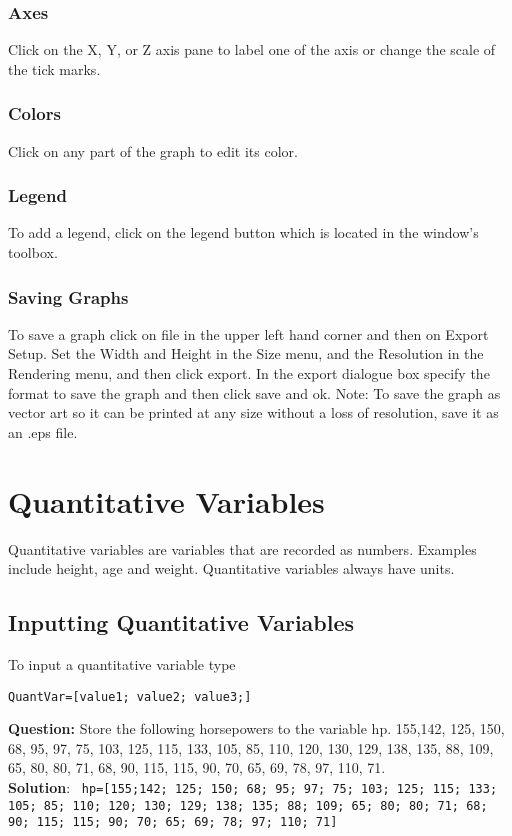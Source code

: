 \documentclass[10pt]{article}
\begin{document}
\subsubsection{Axes}
Click on the X, Y, or Z axis pane to label one of the axis or change the scale of the tick marks.
\subsubsection{Colors}
Click on any part of the graph to edit its color.
\subsubsection{Legend}
To add a legend, click on the legend button which is located in the window's toolbox.
\subsubsection{Saving Graphs}
To save a graph click on file in the upper left hand corner and then on Export Setup. Set the Width and Height in the Size menu, and the Resolution in the Rendering menu, and then click export. In the export dialogue box specify the format to save the graph and then click save and ok. Note: To save the graph as vector art so it can be printed at any size without a loss of resolution, save it as an .eps file. 
\section{Quantitative Variables}
Quantitative variables are variables that are recorded as numbers. Examples include height, age and weight. Quantitative variables always have units.
\subsection{Inputting Quantitative Variables}
To input a quantitative variable type \begin{verbatim}QuantVar=[value1; value2; value3;] \end{verbatim}
\textbf{Question:}
Store the following horsepowers to the variable hp. 155,142, 125, 150, 68, 95, 97, 75, 103, 125, 115, 133, 105, 85, 110, 120, 130, 129, 138, 135, 88, 109, 65, 80, 80, 71, 68, 90, 115, 115, 90, 70, 65, 69, 78, 97, 110, 71.
 \\\textbf{Solution}: 
\texttt{ hp=[155;142; 125; 150; 68; 95; 97; 75; 103; 125; 115; 133; 105; 85; 110; 120; 130; 129; 138; 135; 88; 109; 65; 80; 80; 71; 68; 90; 115; 115; 90; 70; 65; 69; 78; 97; 110; 71]}
\end{document}
